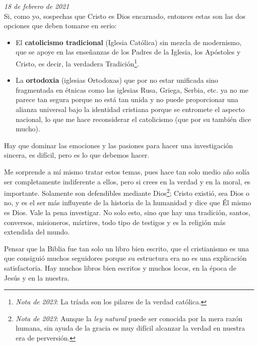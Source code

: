 \documentclass[12pt]{article}
\begin{document}
	\textit{18 de febrero de 2021}\\

	Si, como yo, sospechas que Cristo es Dios encarnado, entonces estas son
	las dos opciones que deben tomarse en serio:

	\begin{itemize}
	\item
		El \textbf{catolicismo tradicional} (Iglesia Católica) sin
			mezcla de modernismo, que se
	apoye en las enseñanzas de los Padres de la Iglesia, los Apóstoles y
			Cristo, es decir, la verdadera Tradición\footnote{
			\textit{Nota de 2023}: La tríada
			 son los pilares
			de la verdad católica.}.
	\item
		La \textbf{ortodoxia} (iglesias Ortodoxas) que por no estar
			unificada sino
	fragmentada en  étnicas como las iglesias Rusa,
	Griega, Serbia, etc. ya no me parece tan segura porque no está tan
	unida y no puede proporcionar una alianza universal bajo la
	identidad cristiana porque se entromete el aspecto nacional, lo que me
	hace reconsiderar el catolicismo (que por su 
	también dice mucho).
	\end{itemize}

	Hay que dominar las emociones y las pasiones para hacer una
	investigación sincera, es difícil, pero es lo que debemos hacer.

	Me sorprende a mí mismo tratar estos temas, pues hace tan solo medio
	año solía ser completamente indiferente a ellos, pero si crees en
	la verdad y en la moral, es importante. Solamente son defendibles
	mediante Dios\footnote{\textit{Nota de 2023}: Aunque la
	\textit{ley natural} puede ser conocida por la mera razón humana, sin
	ayuda de la gracia es muy difícil alcanzar la verdad en nuestra
	era de perversión.}; Cristo existió, sea Dios o no, y es el ser más
	influyente de la historia de la humanidad y dice que Él mismo es Dios.
	Vale la pena investigar. No solo esto, sino que hay una tradición,
	santos, conversos, misioneros, mártires, todo tipo de testigos y es la
	religión más extendida del mundo.

	Pensar que la Biblia fue tan solo un libro bien escrito, que el
	cristianismo es una  que consiguió muchos
	seguidores porque su estructura era  no
	es una explicación satisfactoria. Hay muchos libros bien escritos y
	muchos locos, en la época de Jesús y en la nuestra.
\end{document}
